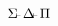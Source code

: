 \documentclass{standalone}
\begin{document}
\Huge
\vspace*{3in}$\displaystyle\Sigma\ \scriptscriptstyle \kern-0.5em\vdash\ \kern-0.5em\displaystyle \Delta\ \scriptscriptstyle \kern-0.5em\vdash\ \kern-0.5em\displaystyle \Pi$
\vspace*{3in}
\end{document}
